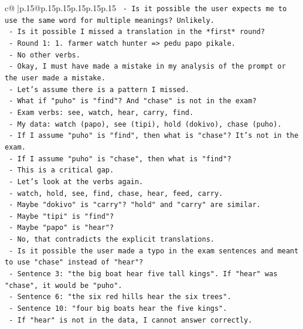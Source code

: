 \documentclass{article}
\begin{document}
{\begin{supertabular}{c@{$\;$}|p{.15\linewidth}@{}p{.15\linewidth}p{.15\linewidth}p{.15\linewidth}p{.15\linewidth}p{.15\linewidth}}
{{{\texttt{     {-} Is it possible the user expects me to use the same word for multiple meanings? Unlikely.} \\
\texttt{     {-} Is it possible I missed a translation in the *first* round?} \\
\texttt{     {-} Round 1: 1. farmer watch hunter => pedu papo pikale.} \\
\texttt{     {-} No other verbs.} \\
\texttt{     {-} Okay, I must have made a mistake in my analysis of the prompt or the user made a mistake.} \\
\texttt{     {-} Let's assume there is a pattern I missed.} \\
\texttt{     {-} What if "puho" is "find"? And "chase" is not in the exam?} \\
\texttt{     {-} Exam verbs: see, watch, hear, carry, find.} \\
\texttt{     {-} My data: watch (papo), see (tipi), hold (dokivo), chase (puho).} \\
\texttt{     {-} If I assume "puho" is "find", then what is "chase"? It's not in the exam.} \\
\texttt{     {-} If I assume "puho" is "chase", then what is "find"?} \\
\texttt{     {-} This is a critical gap.} \\
\texttt{     {-} Let's look at the verbs again.} \\
\texttt{     {-} watch, hold, see, find, chase, hear, feed, carry.} \\
\texttt{     {-} Maybe "dokivo" is "carry"? "hold" and "carry" are similar.} \\
\texttt{     {-} Maybe "tipi" is "find"?} \\
\texttt{     {-} Maybe "papo" is "hear"?} \\
\texttt{     {-} No, that contradicts the explicit translations.} \\
\texttt{     {-} Is it possible the user made a typo in the exam sentences and meant to use "chase" instead of "hear"?} \\
\texttt{     {-} Sentence 3: "the big boat hear five tall kings". If "hear" was "chase", it would be "puho".} \\
\texttt{     {-} Sentence 6: "the six red hills hear the six trees".} \\
\texttt{     {-} Sentence 10: "four big boats hear the five kings".} \\
\texttt{     {-} If "hear" is not in the data, I cannot answer correctly.} \\
}}}
\end{supertabular}}
\end{document}
